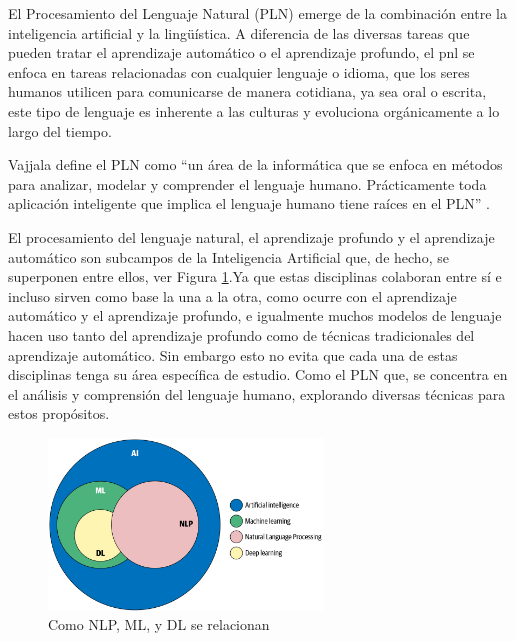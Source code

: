 El Procesamiento del Lenguaje Natural (PLN) emerge de la combinación entre la inteligencia artificial y la lingüística. A diferencia de las diversas tareas que pueden tratar el aprendizaje automático o el aprendizaje profundo, el pnl se enfoca en tareas relacionadas con cualquier lenguaje o idioma, que los seres humanos utilicen para comunicarse de manera cotidiana, ya sea oral o escrita, este tipo de lenguaje es inherente a las culturas y evoluciona orgánicamente a lo largo del tiempo.

Vajjala define el PLN como ``un área de la informática que se enfoca en métodos para analizar, modelar y comprender el lenguaje humano. Prácticamente toda aplicación inteligente que implica el lenguaje humano tiene raíces en el PLN'' \cite[p. 4]{vajjala2020practical}.
 
El procesamiento del lenguaje natural, el aprendizaje profundo y el aprendizaje automático son subcampos de la Inteligencia Artificial que, de hecho, se superponen  entre ellos, ver Figura \ref{fig:nlp1}.Ya que estas disciplinas colaboran entre sí e incluso sirven como base la una a la otra, como ocurre con el aprendizaje automático y el aprendizaje profundo, e igualmente  muchos modelos de lenguaje hacen uso tanto del aprendizaje profundo como de técnicas tradicionales del aprendizaje automático. Sin embargo esto no evita que cada una de estas disciplinas tenga su área específica de estudio. Como el PLN que, se concentra en el análisis y comprensión del lenguaje humano, explorando diversas técnicas para estos propósitos.

\begin{figure}
	\includegraphics[width=0.65\textwidth]{capitulo3/figuras/nlp1.png}
	\caption{Como NLP, ML, y DL se relacionan}
	\label{fig:nlp1}
\end{figure}
